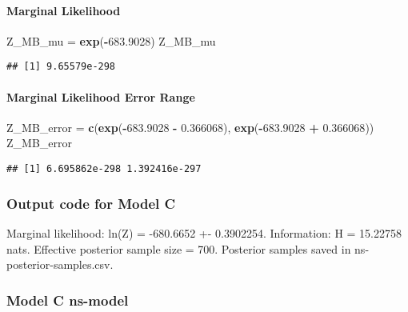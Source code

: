 \documentclass[
]{article}
\newenvironment{Shaded}{\begin{snugshade}}{\end{snugshade}}
\newcommand{\FloatTok}[1]{\textcolor[rgb]{0.00,0.00,0.81}{#1}}
\newcommand{\FunctionTok}[1]{\textcolor[rgb]{0.13,0.29,0.53}{\textbf{#1}}}
\newcommand{\NormalTok}[1]{#1}
\newcommand{\OtherTok}[1]{\textcolor[rgb]{0.56,0.35,0.01}{#1}}
\newcommand{\SpecialCharTok}[1]{\textcolor[rgb]{0.81,0.36,0.00}{\textbf{#1}}}
\begin{document}
\hypertarget{marginal-likelihood-1}{%
\paragraph{Marginal Likelihood}\label{marginal-likelihood-1}}

\begin{Shaded}
\begin{Highlighting}[]
\NormalTok{Z\_MB\_mu }\OtherTok{=} \FunctionTok{exp}\NormalTok{(}\SpecialCharTok{{-}}\FloatTok{683.9028}\NormalTok{)}
\NormalTok{Z\_MB\_mu}
\end{Highlighting}
\end{Shaded}

\begin{verbatim}
## [1] 9.65579e-298
\end{verbatim}

\hypertarget{marginal-likelihood-error-range-1}{%
\paragraph{Marginal Likelihood Error
Range}\label{marginal-likelihood-error-range-1}}

\begin{Shaded}
\begin{Highlighting}[]
\NormalTok{Z\_MB\_error }\OtherTok{=} \FunctionTok{c}\NormalTok{(}\FunctionTok{exp}\NormalTok{(}\SpecialCharTok{{-}}\FloatTok{683.9028} \SpecialCharTok{{-}} \FloatTok{0.366068}\NormalTok{), }\FunctionTok{exp}\NormalTok{(}\SpecialCharTok{{-}}\FloatTok{683.9028} \SpecialCharTok{+} \FloatTok{0.366068}\NormalTok{))}
\NormalTok{Z\_MB\_error}
\end{Highlighting}
\end{Shaded}

\begin{verbatim}
## [1] 6.695862e-298 1.392416e-297
\end{verbatim}

\hypertarget{output-code-for-model-c}{%
\subsubsection{Output code for Model C}\label{output-code-for-model-c}}

Marginal likelihood: ln(Z) = -680.6652 +- 0.3902254. Information: H =
15.22758 nats. Effective posterior sample size = 700. Posterior samples
saved in ns-posterior-samples.csv.

\hypertarget{model-c-ns-model}{%
\subsubsection{Model C ns-model}\label{model-c-ns-model}}
\end{document}
